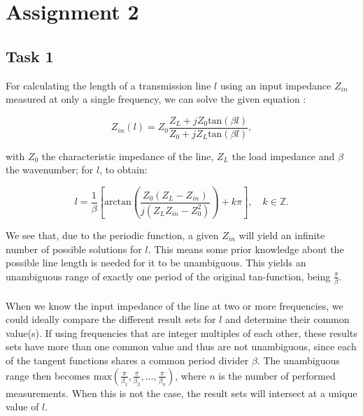 \documentclass[11pt,titlepage]{report}
\begin{document}
\chapter{Assignment 2}
\section{Task 1}
For calculating the length of a transmission line $l$ using an input impedance $Z_{in}$ measured at only a single frequency, we can solve the given equation \cite[67]{epo4-manual}: 

\begin{equation}
\label{eq:ass2-Zin}
	Z_{in}(l) = Z_0 \frac{Z_L+jZ_0\mathrm{tan}(\beta l)}{Z_0+jZ_L\mathrm{tan}(\beta l)},
\end{equation}

with $Z_0$ the characteristic impedance of the line, $Z_L$ the load impedance and $\beta$ the wavenumber; for $l$, to obtain:

\begin{equation}
\label{eq:ass2-l}
	l = \frac{1}{\beta}\left[\mathrm{arctan}\left(\frac{Z_0 (Z_L - Z_{in})}{j(Z_L Z_{in} - Z_0^2)}\right) + k\pi\right], \quad k \in \mathbb{Z}.
\end{equation}

We see that, due to the periodic function, a given $Z_{in}$ will yield an infinite number of possible solutions for $l$. This means some prior knowledge about the possible line length is needed for it to be unambiguous. This yields an unambiguous range of exactly one period of the original tan-function, being $\frac{\pi}{\beta}$.
\\
\\
When we know the input impedance of the line at two or more frequencies, we could ideally compare the different result sets for $l$ and determine their common value(s). If using frequencies that are integer multiples of each other, these results sets have more than one common value and thus are not unambiguous, since each of the tangent functions shares a common period divider $\beta$. The unambiguous range then becomes $\mathrm{max}\left(\frac{\pi}{\beta_1}, \frac{\pi}{\beta_2}, ... , \frac{\pi}{\beta_n}\right)$, where $n$ is the number of performed measurements. When this is not the case, the result sets will intersect at a unique value of $l$.
\end{document}
